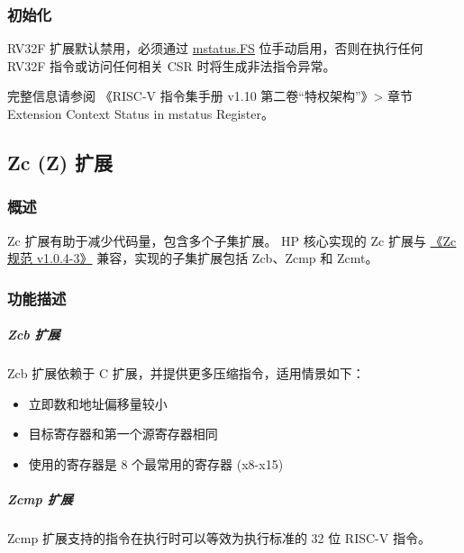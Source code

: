 \documentclass[main\_\_CN.tex]{subfiles}
\begin{document}
\subsubsection{初始化}
\label{sec:riscvcpu-fpu-init}

RV32F 扩展默认禁用，必须通过 \hyperref[fielddesc:MSTATUS_FS]{mstatus.FS} 位手动启用，否则在执行任何 RV32F 指令或访问任何相关 CSR 时将生成非法指令异常。

完整信息请参阅 《RISC-V 指令集手册 v1.10 第二卷“特权架构”》> 章节 Extension Context Status in mstatus Register。

\newpage


\newpage
\subsection{Zc (Z) 扩展}
\label{sec:riscvcpu-zc}

\subsubsection{概述}
\label{sec:riscvcpu-zc-overview}

Zc 扩展有助于减少代码量，包含多个子集扩展。\chipname{} HP 核心实现的 Zc 扩展与 \href{https://github.com/riscvarchive/riscv-code-size-reduction/blob/v1.0.4-3/Zc-specification/Zc.adoc}{《Zc 规范 v1.0.4-3》} 兼容，实现的子集扩展包括 Zcb、Zcmp 和 Zcmt。

\subsubsection{功能描述}
\label{sec:riscvcpu-zc-func-descr}

\subparagraph{Zcb 扩展}

Zcb 扩展依赖于 C 扩展，并提供更多压缩指令，适用情景如下：
\begin{itemize}
    \item 立即数和地址偏移量较小
    \item 目标寄存器和第一个源寄存器相同
    \item 使用的寄存器是 8 个最常用的寄存器 (x8-x15)
\end{itemize}

\subparagraph{Zcmp 扩展}

Zcmp 扩展支持的指令在执行时可以等效为执行标准的 32 位 RISC-V 指令。
\end{document}
